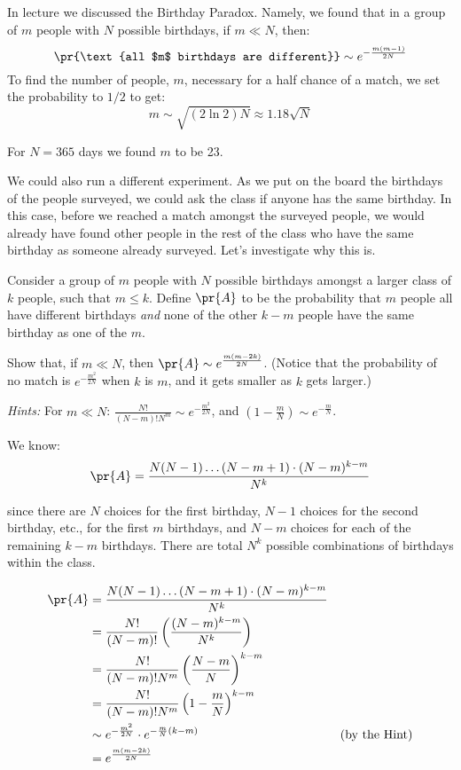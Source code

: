 \begin{problem}   %
In lecture we discussed the Birthday Paradox.  Namely, we found that
in a group of $m$ people with $N$ possible birthdays, if $m \ll N$,
then:
\[
\pr{\text{all $m$ birthdays are different}} \sim e^{-\frac{m(m-1)}{2N}}
\]
To find the number of people, $m$, necessary for a half chance of a
match, we set the probability to $1/2$ to get:
\[
m \sim \sqrt{(2\ln2)N} \approx 1.18\sqrt{N}
\]

For $N = 365$ days we found $m$ to be 23.

We could also run a different experiment. As we put on the board the
birthdays of the people surveyed, we could ask the class if anyone has
the same birthday. In this case, before we reached a match amongst the
surveyed people, we would already have found other people in the rest
of the class who have the same birthday as someone already
surveyed. Let's investigate why this is.

\bparts

\ppart Consider a group of $m$ people with $N$ possible birthdays
amongst a larger class of $k$ people, such that $m \leq k$. Define
$\pr{A}$ to be the probability that $m$ people all have different
birthdays \textit{and} none of the other $k-m$ people have the same
birthday as one of the $m$.

Show that, if $m \ll N$, then $\pr{A} \sim
e^{\frac{m(m-2k)}{2N}}$. (Notice that the probability of no match is
$e^{-\frac{m^2}{2N}}$ when $k$ is $m$, and it gets smaller as $k$ gets
larger.)

\hspace{0.5in} \textit{Hints:} For $m \ll N$: $\frac{N!}{(N-m)!N^m}
\sim e^{-\frac{m^2}{2N}}$, and $(1-\frac{m}{N}) \sim
e^{-\frac{m}{N}}$.

\begin{solution}

We know:
\[
\pr{A} = \frac{N(N-1)\ldots(N-m+1)\cdot(N-m)^{k-m}}{N^k}
\]

since there are $N$ choices for the first birthday, $N-1$ choices for
the second birthday, etc., for the first $m$ birthdays, and $N-m$
choices for each of the remaining $k-m$ birthdays. There are total
$N^k$ possible combinations of birthdays within the class.

\begin{align*}
\pr{A} &= \frac{N(N-1)\ldots(N-m+1)\cdot(N-m)^{k-m}}{N^k} \\
&= \frac{N!}{(N-m)!}\left(\frac{(N-m)^{k-m}}{N^k}\right) \\
&= \frac{N!}{(N-m)!N^m}\left(\frac{N-m}{N}\right)^{k-m} \\
&= \frac{N!}{(N-m)!N^m}\left(1-\frac{m}{N}\right)^{k-m} \\
&\sim e^{-\frac{m^2}{2N}} \cdot e^{-\frac{m}{N}(k-m)} & \text{(by the Hint)} \\
& = e^{\frac{m(m-2k)}{2N}}
\end{align*}
\end{solution}


\end{problem}
